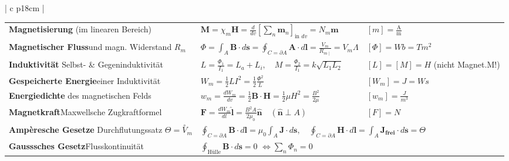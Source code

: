 \begin{tabular}{ | c   p{18cm} |}
\begin{tabular}{L{5cm} L{6.5cm} L{5.3cm}}
			
			\rowcolor[rgb]{1,1,1}
			\textbf{Magnetisierung } \qquad\qquad\qquad (im linearen Bereich)&
			$\displaystyle \mathbf{M}=\chi_{m} \mathbf{H}=\frac{d}{d v}\left[\sum_{n} \mathbf{m}_{n}\right]_{\text {in } d v}=N_{m} \mathbf{m}$
			& $\displaystyle [m]=\frac{\mathrm{A}}{\mathrm{m}} $\\[5pt]
			
			
			
			\rowcolor[rgb]{0.91,0.91,0.91}
			\textbf{Magnetischer Fluss}\qquad\qquad und magn. Widerstand $R_m$ &$\displaystyle \Phi=\int_{A} \mathbf{B} \cdot d \mathbf{s}=\oint_{C=\partial A} \mathbf{A} \cdot d \mathbf{l}=\frac{V_{m}}{R_{m \mid}}=V_{m} \Lambda$&$[\Phi]=Wb=Tm^2$\\[5pt]
					
					
			\textbf{Induktivität } \qquad\qquad\qquad Selbst- \& Gegeninduktivität&
			$\displaystyle L=\frac{\Phi_{1}}{I_{1}}=L_{a}+L_{i}, \quad M=\frac{\Phi_{2}}{I_{1}}=k \sqrt{L_{1} L_{2}}$& $\displaystyle [L]=[M]=H$ \qquad (nicht Magnet.M!) \\[5pt]		
				
			\textbf{Gespeicherte Energie}\qquad\qquad einer Induktivität &$\displaystyle W_{m}=\frac{1}{2} L I^{2}=\frac{1}{2} \frac{\Phi^{2}}{L}$&$\displaystyle [W_m]=J=Ws$\\[5pt]	
			
			
			
			\textbf{Energiedichte } \qquad\qquad\qquad des magnetischen Felds&
			$\displaystyle w_{m}=\frac{d W_{m}}{d v}=\frac{1}{2} \mathbf{B} \cdot \mathbf{H}=\frac{1}{2} \mu H^{2}=\frac{B^{2}}{2 \mu}$& $\displaystyle [w_m]=\frac{J}{m^3}$ \\[5pt]	
					
					
				
			\textbf{Magnetkraft}\qquad\qquad Maxwellsche Zugkraftformel &$\displaystyle \mathbf{F}=\frac{d W_{m}}{d l} \hat{\mathbf{l}}=\frac{B^{2} A}{2 \mu_{0}} \hat{\mathbf{n}} \quad(\hat{\mathbf{n}} \perp A)$&$\displaystyle [F]=N$\\[5pt]
			
			\textbf{Ampèresche Gesetze} \qquad\qquad\qquad Durchflutungssatz $\Theta =\stackrel{\circ}{V}_{m}$& \\[5pt]	
		
			\textbf{Gausssches Gesetz}\qquad\qquad Flusskontinuität &
			\\[5pt]
					
		\end{tabular}\\
		\hline
	\end{tabular}